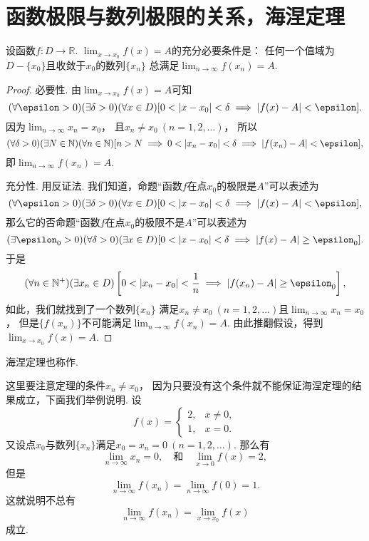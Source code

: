 \section{函数极限与数列极限的关系，海涅定理}
\begin{theorem}[海涅定理]\label{theorem:极限.海涅定理}
设函数\(f\colon D\to\mathbb{R}\).
\(\lim_{x \to x_0} f(x) = A\)的充分必要条件是：
任何一个值域为\(D-\{x_0\}\)且收敛于\(x_0\)的数列\(\{x_n\}\)
总满足\(\lim_{n\to\infty} f(x_n) = A\).
\begin{proof}
必要性.
由\(\lim_{x \to x_0} f(x) = A\)可知\[
	(\forall\epsilon>0)
	(\exists\delta>0)
	(\forall x\in D)
	[
		0<\abs{x-x_0}<\delta
		\implies
		\abs{f(x)-A}<\epsilon
	].
\]
因为\(\lim_{n\to\infty} x_n = x_0\)，
且\(x_n \neq x_0\ (n=1,2,\dotsc)\)，
所以\[
	(\forall\delta>0)
	(\exists N\in\mathbb{N})
	(\forall n\in\mathbb{N})
	[
		n>N
		\implies
		0<\abs{x_n-x_0}<\delta
		\implies
		\abs{f(x_n)-A}<\epsilon
	],
\]
即\(\lim_{n\to\infty} f(x_n) = A\).

充分性.
用反证法.
我们知道，命题“函数\(f\)在点\(x_0\)的极限是\(A\)”可以表述为\[
	(\forall\epsilon>0)
	(\exists\delta>0)
	(\forall x\in D)
	[
		0<\abs{x-x_0}<\delta
		\implies
		\abs{f(x)-A}<\epsilon
	],
\]
那么它的否命题“函数\(f\)在点\(x_0\)的极限不是\(A\)”可以表述为\[
	(\exists\epsilon_0>0)
	(\forall\delta>0)
	(\exists x\in D)
	[
		0<\abs{x-x_0}<\delta
		\implies
		\abs{f(x)-A}\geq\epsilon_0
	].
\]
于是\[
	(\forall n\in\mathbb{N}^+)
	(\exists x_n\in D)
	\left[
		0<\abs{x_n-x_0}<\frac1n
		\implies
		\abs{f(x_n)-A}\geq\epsilon_0
	\right],
\]
如此，我们就找到了一个数列\(\{x_n\}\)
满足\(x_n\neq x_0\ (n=1,2,\dotsc)\)且\(\lim_{n\to\infty} x_n = x_0\)，
但是\(\{f(x_n)\}\)不可能满足\(\lim_{n\to\infty} f(x_n) = A\).
由此推翻假设，得到\(\lim_{x\to x_0} f(x) = A\).
\end{proof}
\end{theorem}
海涅定理也称作.

这里要注意定理的条件\(x_n \neq x_0\)，
因为只要没有这个条件就不能保证海涅定理的结果成立，下面我们举例说明.
设\[
	f(x) = \left\{ \begin{array}{cl}
		2, & x\neq0, \\
		1, & x=0.
	\end{array} \right.
\]
又设点\(x_0\)与数列\(\{x_n\}\)满足\(x_0=x_n=0\ (n=1,2,\dotsc)\).
那么有\[
	\lim_{n\to\infty} x_n = 0,
	\quad\text{和}\quad
	\lim_{x\to0} f(x) = 2,
\]
但是\[
	\lim_{n\to\infty} f(x_n) = \lim_{n\to\infty} f(0) = 1.
\]这就说明不总有\[
	\lim_{n\to\infty} f(x_n)
	= \lim_{x \to x_0} f(x)
\]成立.

